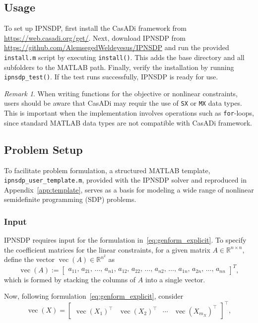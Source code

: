 \documentclass[]{interact}
\newcommand{\vect}{\operatorname{vec}}
\theoremstyle{plain}%
\theoremstyle{definition}
\theoremstyle{remark}
\newtheorem{remark}{Remark}
\begin{document}
\subsection{Usage}\label{sec:usage}

To set up IPNSDP, first install the CasADi framework from \url{https://web.casadi.org/get/}. Next, download IPNSDP from \url{https://github.com/AlemsegedWeldeyesus/IPNSDP} and run the provided \texttt{install.m} script by executing \texttt{install()}. This adds the base directory and all subfolders to the MATLAB path. Finally, verify the installation by running \texttt{ipnsdp\_test()}. If the test runs successfully, IPNSDP is ready for use.

\begin{remark}
    When writing functions for the objective or nonlinear constraints, users should be aware that CasADi may requir the use of \texttt{SX} or \texttt{MX} data types. This is important when the implementation involves operations such as \texttt{for}-loops, since standard MATLAB data types are not compatible with CasADi framework.
\end{remark}



\subsection{Problem Setup}
To facilitate problem formulation, a structured MATLAB template, \texttt{ipnsdp\_user\_template.m}, provided with the IPNSDP solver and reproduced in Appendix~\ref{app:template}, serves as a basis for modeling a wide range of nonlinear semidefinite programming (SDP) problems.

\subsubsection{Input}
IPNSDP requires input for the formulation in~\eqref{eq:genform_explicit}. To specify the coefficient matrices for the linear constraints, for a given matrix \(A \in \mathbb{R}^{n \times n}\), define the vector \(\operatorname{vec}(A) \in \mathbb{R}^{n^2}\) as
\[
\operatorname{vec}(A) := 
\begin{bmatrix}
a_{11},\, a_{21},\, \dots,\, a_{n1},\, 
a_{12},\, a_{22},\, \dots,\, a_{n2},\, \dots,\, 
a_{1n},\, a_{2n},\, \dots,\, a_{nn}
\end{bmatrix}^T,
\]
which is formed by stacking the columns of \(A\) into a single vector.

Now, following formulation~\eqref{eq:genform_explicit}, consider
\begin{equation}\label{eq:vecX}
\vect(X) =
\begin{bmatrix}
\vect(X_1)^\top & \vect(X_2)^\top & \cdots & \vect(X_{m_X})^\top
\end{bmatrix}^\top,
\end{equation}
\end{document}
